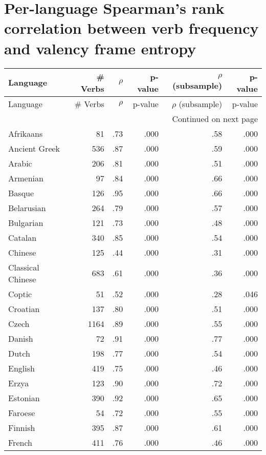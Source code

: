 \section{Per-language Spearman's rank correlation between verb frequency and valency frame entropy}\label{appendix:exp2-rho-freq-valency}
\begin{longtable}{lrrrrr}
    \toprule
    Language & \# Verbs & $\rho$ & p-value & $\rho$ (subsample) & p-value \\
    \midrule
    \endfirsthead
    \toprule
    Language & \# Verbs & $\rho$ & p-value & $\rho$ (subsample) & p-value \\
    \midrule
    \endhead
    \midrule
    \multicolumn{6}{r}{Continued on next page} \\
    \midrule
    \endfoot
    \bottomrule
    \endlastfoot
    Afrikaans & 81 & .73 & .000 & .58 & .000 \\
    Ancient Greek & 536 & .87 & .000 & .59 & .000 \\
    Arabic & 206 & .81 & .000 & .51 & .000 \\
    Armenian & 97 & .84 & .000 & .66 & .000 \\
    Basque & 126 & .95 & .000 & .66 & .000 \\
    Belarusian & 264 & .79 & .000 & .57 & .000 \\
    Bulgarian & 121 & .73 & .000 & .48 & .000 \\
    Catalan & 340 & .85 & .000 & .54 & .000 \\
    Chinese & 125 & .44 & .000 & .31 & .000 \\
    Classical Chinese & 683 & .61 & .000 & .36 & .000 \\
    Coptic & 51 & .52 & .000 & .28 & .046 \\
    Croatian & 137 & .80 & .000 & .51 & .000 \\
    Czech & 1164 & .89 & .000 & .55 & .000 \\
    Danish & 72 & .91 & .000 & .77 & .000 \\
    Dutch & 198 & .77 & .000 & .54 & .000 \\
    English & 419 & .75 & .000 & .46 & .000 \\
    Erzya & 123 & .90 & .000 & .72 & .000 \\
    Estonian & 390 & .92 & .000 & .65 & .000 \\
    Faroese & 54 & .72 & .000 & .55 & .000 \\
    Finnish & 395 & .87 & .000 & .61 & .000 \\
    French & 411 & .76 & .000 & .46 & .000 \\

\end{longtable}
